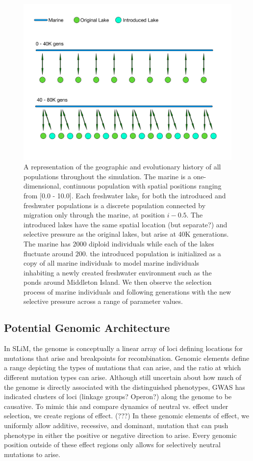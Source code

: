 \documentclass{article}
\begin{document}
\begin{figure}
	\begin{center}
  		\includegraphics[width=0.6\linewidth]{GeographyDiagram}
  		\caption{A representation of the geographic and evolutionary history of all populations throughout the simulation. 
		The marine is a one-dimensional, continuous population with spatial positions ranging from [0.0 - 10.0]. 
		Each freshwater lake$_{i}$ for both the introduced and freshwater populations
		is a discrete population connected by migration only through the marine, at position $i - 0.5$. 
		The introduced lakes have the same spatial location (but separate?) and selective pressure as the original lakes, but arise at 40K generations.
		The marine has $2000$ diploid individuals while each of the lakes fluctuate around $200$. 
		the introduced population is initialized as a copy of all marine individuals to model marine 
		individuals inhabiting a newly created freshwater environment such as the ponds around Middleton Island.
		We then observe the selection process of marine individuals and following generations 
		with the new selective pressure across a range of parameter values. 
		}
  		\label{fig:Geo}
	\end{center}
\end{figure}

\subsection*{Potential Genomic Architecture}

In SLiM, the genome is conceptually a linear array of loci defining locations for 
mutations that arise and breakpoints for recombination. 
Genomic elements define a range depicting the types of mutations that can arise, and the ratio at which different mutation types can arise. 
Although still uncertain about how much of the genome is directly associated with the distinguished phenotypes, 
GWAS has indicated clusters of loci (linkage groups? Operon?) along the genome to be causative. 
To mimic this and compare dynamics of neutral vs. effect under selection, 
we create regions of effect. (???)
In these genomic elements of effect, we uniformly allow additive, recessive, and dominant, mutation that can push phenotype in either the positive or negative direction to arise. 
Every genomic position outside of these effect regions only allows for selectively neutral mutations to arise.
\end{document}
